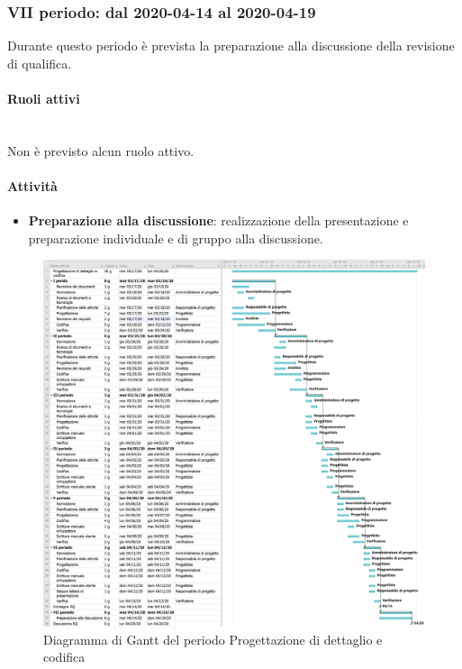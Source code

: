 \subsubsection{VII periodo: dal 2020-04-14 al 2020-04-19}
Durante questo periodo è prevista la preparazione alla discussione della revisione di qualifica.
\paragraph{Ruoli attivi} \mbox{}\\ [1mm]
Non è previsto alcun ruolo attivo.
\paragraph{Attività}

\begin{itemize}
	\item \textbf{Preparazione alla discussione}: realizzazione della presentazione e preparazione individuale e di gruppo alla discussione.
\end{itemize}

\begin{figure}
	\includegraphics[width=\linewidth]{./gantt/Progettazione di dettaglio e codifica.png}
	\caption{Diagramma di Gantt del periodo Progettazione di dettaglio e codifica}
\end{figure}
\pagebreak

